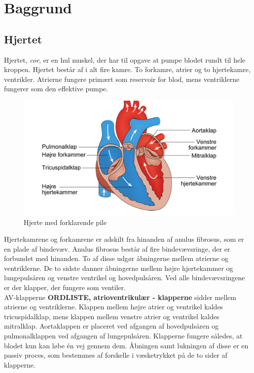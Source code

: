 \chapter{Baggrund}

\section{Hjertet}
Hjertet, \textit{cor}, er en hul muskel, der har til opgave at pumpe blodet rundt til hele kroppen. Hjertet består af i alt fire kamre. To forkamre, atrier og to hjertekamre, ventrikler. Atrierne fungere primært som reservoir for blod, mens ventriklerne fungerer som den effektive pumpe.\\

\begin{figure}[htb]
	\centering
	\includegraphics[width=1\textwidth]{Figurer/Snip20150410_31}
	\caption{Hjerte med forklarende pile \protect\footnotemark} 
\end{figure}

Hjertekamrene og forkamrene er adskilt fra hinanden af anulus fibrosus, som er en plade af bindevæv. Anulus fibrosus består af fire bindevævsringe, der er forbundet med hinanden. To af disse udgør åbningerne mellem atrierne og ventriklerne. De to sidste danner åbningerne mellem højre hjertekammer og lungepulsåren og venstre ventrikel og hovedpulsåren. Ved alle bindevævsringene er der klapper, der fungere som ventiler.\\ 
AV-klapperne \textbf{ORDLISTE, atrioventrikulær - klapperne} sidder mellem atrierne og ventriklerne. Klappen mellem højre atrier og ventrikel kaldes tricuspidalklap, mens klappen mellem venstre atrier og ventrikel kaldes mitralklap. Aortaklappen er placeret ved afgangen af hovedpulsåren og pulmonalklappen ved afgangen af lungepulsåren. Klapperne fungere således, at blodet kun kan løbe én vej gennem dem. Åbningen samt lukningen af disse er en passiv proces, som bestemmes af forskelle i væsketrykket på de to sider af klapperne.\\ 

